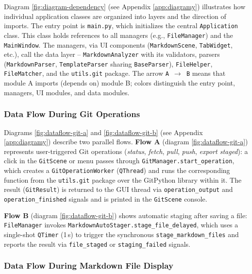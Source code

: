 \documentclass[12pt, a4paper]{article}
\begin{document}
Diagram \ref{fig:diagram-dependency} (see Appendix \ref{app:diagramy}) illustrates how individual 
application classes are organized into layers and the direction of imports. The entry point is 
\texttt{main.py}, which initializes the central \texttt{Application} class. This class holds 
references to all managers (e.g., \texttt{FileManager}) and the \texttt{MainWindow}. The managers, 
via UI components (\texttt{MarkdownScene}, \texttt{TabWidget}, etc.), call the data layer -- 
\texttt{MarkdownAnalyzer} with its validators, parsers (\texttt{MarkdownParser}, \texttt{TemplateParser} 
sharing \texttt{BaseParser}), \texttt{FileHelper}, \texttt{FileMatcher}, and the \texttt{utils.git} 
package. The arrow \texttt{A $\rightarrow$ B} means that module A imports (depends on) module B; 
colors distinguish the entry point, managers, UI modules, and data modules.

\subsubsection*{Data Flow During Git Operations}

Diagrams \ref{fig:dataflow-git-a} and \ref{fig:dataflow-git-b} (see Appendix \ref{app:diagramy}) 
describe two parallel flows. \textbf{Flow A} (diagram \ref{fig:dataflow-git-a}) represents 
user-triggered Git operations (\emph{status}, \emph{fetch}, \emph{pull}, \emph{push}, 
\emph{export staged}): a click in the \texttt{GitScene} or menu passes through \texttt{GitManager.\allowbreak start\_operation},
which creates a \texttt{GitOperationWorker} (\texttt{QThread}) and runs the corresponding 
function from the \texttt{utils.git} package over the GitPython library within it. 
The result (\texttt{GitResult}) is returned to the GUI thread via \texttt{operation\_output} 
and \texttt{operation\_finished} signals and is printed in the \texttt{GitScene} console.

\textbf{Flow B} (diagram \ref{fig:dataflow-git-b}) shows automatic staging after saving a 
file: \texttt{FileManager} invokes \texttt{MarkdownAutoStager.\allowbreak stage\_file\_delayed}, 
which uses a single-shot \texttt{QTimer} (1\,s) to trigger the synchronous 
\texttt{stage\_\allowbreak markdown\_\allowbreak files} and reports the result via 
\texttt{file\_\allowbreak staged} or \texttt{staging\_\allowbreak failed} signals.

\subsubsection*{Data Flow During Markdown File Display}
\end{document}
